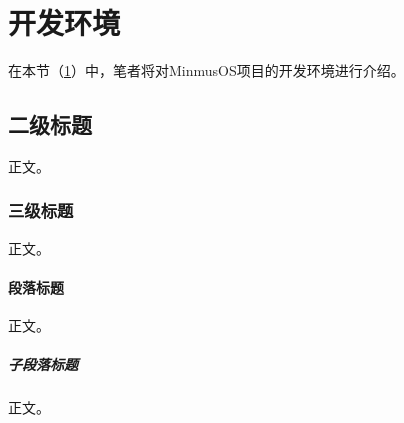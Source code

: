 \section{开发环境}\label{sec:DevelopmentEnvironment}

在本节（\cref{sec:DevelopmentEnvironment}）中，笔者将对MinmusOS项目的开发环境进行介绍。

\subsection{二级标题}

正文。

\subsubsection{三级标题}

正文。

\paragraph{段落标题}

正文。

\subparagraph{子段落标题}

正文。
